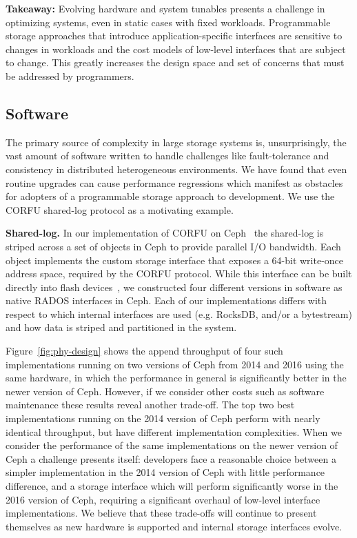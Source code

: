 \textbf{Takeaway:} Evolving hardware and system tunables presents a challenge
in optimizing systems, even in static cases with fixed workloads. Programmable
storage approaches that introduce application-specific interfaces are
sensitive to changes in workloads and the cost models of
low-level interfaces that are subject to change. This greatly increases the design
space and set of concerns that must be addressed by programmers.

\subsection{Software}
\label{software}

The primary source of complexity in large storage systems is, unsurprisingly,
the vast amount of software written to handle challenges like fault-tolerance
and consistency in distributed heterogeneous environments. We have found that
even routine upgrades can cause performance regressions which manifest as obstacles 
for adopters of a programmable storage approach to development. We use the
CORFU shared-log protocol as a motivating example.

{\bf Shared-log.} In our implementation of CORFU on Ceph~\cite{zlog} the shared-log is striped
across a set of objects in Ceph to provide parallel I/O bandwidth. Each object
implements the custom storage interface that exposes a 64-bit write-once address
space, required by the CORFU protocol.  While this interface can be
built directly into flash devices~\cite{wei:systor13}, we constructed four
different versions in software as native RADOS interfaces in Ceph. Each of our
implementations differs with respect to which internal interfaces are used
(e.g. RocksDB, and/or a bytestream) and how data is striped and partitioned in the system.

Figure~\ref{fig:phy-design} shows the append throughput of four such
implementations running on two versions of Ceph from 2014 and 2016 using the same hardware, in which
the performance in general is significantly better in the newer version of
Ceph. However, if we consider other costs such as software maintenance these results
reveal another trade-off. The top two best implementations running on
the 2014 version of Ceph perform with nearly identical throughput, but
have different implementation complexities. When we consider the performance
of the same implementations on the newer version of Ceph a challenge presents
itself: developers face a reasonable choice between a simpler implementation in the
2014 version of Ceph with little performance difference, and a storage
interface which will perform significantly worse in the 2016 version of Ceph,
requiring a significant overhaul of low-level interface implementations. We
believe that these trade-offs will continue to present themselves as new
hardware is supported and internal storage interfaces evolve.

